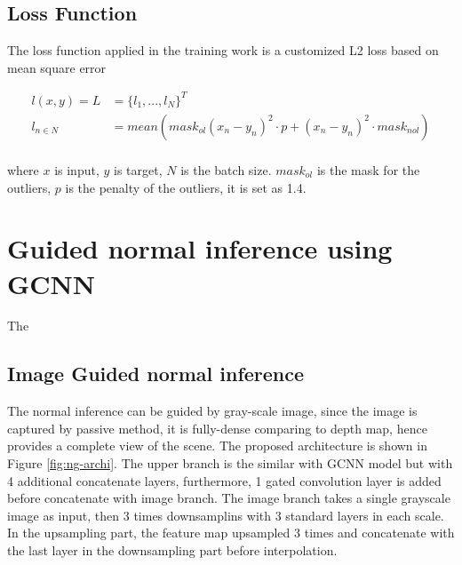 \subsection{Loss Function}
The loss function applied in the training work is a customized L2 loss based on mean square error

\begin{equation}\label{gcnn-loss}
	\begin{array}{ll}
		l(x,y)= L  &= \{l_1, ..., l_N\}^T\\ 
		l_{n\in N} &= mean(mask_{ol}(x_n - y_n)^2\cdot p + (x_n - y_n)^2\cdot mask_{nol})\\
	\end{array}
\end{equation}

where $ x $ is input, $ y $ is target, $ N $ is the batch size. $ mask_{ol} $ is the mask for the outliers, $ p $ is the penalty of the outliers, it is set as 1.4.





\newpage
\section{Guided normal inference using GCNN}
The 
\subsection{Image Guided normal inference}
The normal inference can be guided by gray-scale image, since the image is captured by passive method, it is fully-dense comparing to depth map, hence provides a complete view of the scene. 
The proposed architecture is shown in Figure \ref{fig:ng-archi}. The upper branch is the similar with GCNN model but with 4 additional concatenate layers, furthermore, 1 gated convolution layer is added before concatenate with image branch. The image branch takes a single grayscale image as input, then 3 times downsamplins with 3 standard layers in each scale. In the upsampling part, the feature map upsampled 3 times and concatenate with the last layer in the downsampling part before interpolation.


